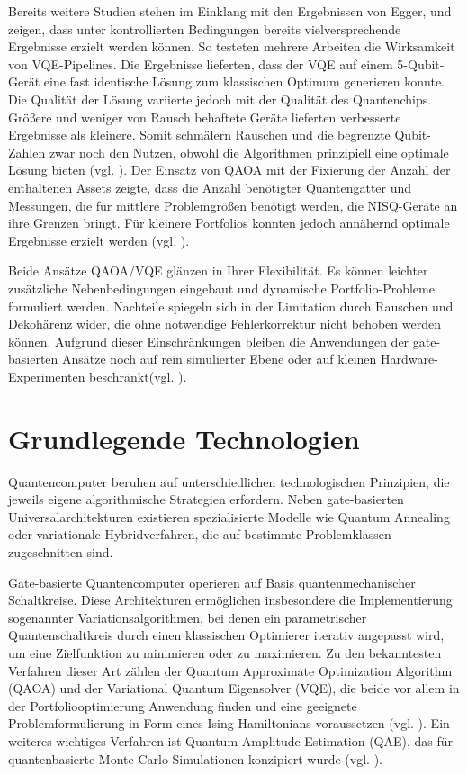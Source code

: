 Bereits weitere Studien stehen im Einklang mit den Ergebnissen von Egger, und zeigen, dass unter kontrollierten Bedingungen bereits vielversprechende Ergebnisse erzielt werden können. So testeten mehrere Arbeiten die Wirksamkeit von VQE-Pipelines. Die Ergebnisse lieferten, dass der VQE auf einem 5-Qubit-Gerät eine fast identische Lösung zum klassischen Optimum generieren konnte. Die Qualität der Lösung variierte jedoch mit der Qualität des Quantenchips. Größere und weniger von Rausch behaftete Geräte lieferten verbesserte Ergebnisse als kleinere. Somit schmälern Rauschen und die begrenzte Qubit-Zahlen zwar noch den Nutzen, obwohl die Algorithmen prinzipiell eine optimale Lösung bieten (vgl. \cite{buonaiuto_best_2023}).
Der Einsatz von QAOA mit der Fixierung der Anzahl der enthaltenen Assets zeigte, dass die Anzahl benötigter Quantengatter und Messungen, die für mittlere Problemgrößen benötigt werden, die NISQ-Geräte an ihre Grenzen bringt. Für kleinere Portfolios konnten jedoch annähernd optimale Ergebnisse erzielt werden (vgl. \cite{brandhofer_benchmarking_2022}).
 
Beide Ansätze QAOA/VQE glänzen in Ihrer Flexibilität. Es können leichter zusätzliche Nebenbedingungen eingebaut und dynamische Portfolio-Probleme formuliert werden. Nachteile spiegeln sich in der Limitation durch Rauschen und Dekohärenz wider, die ohne notwendige Fehlerkorrektur nicht behoben werden können. Aufgrund dieser Einschränkungen bleiben die Anwendungen der gate-basierten Ansätze noch auf rein simulierter Ebene oder auf kleinen Hardware-Experimenten beschränkt(vgl. \cite{buonaiuto_best_2023}).


\section{Grundlegende Technologien}

Quantencomputer beruhen auf unterschiedlichen technologischen Prinzipien, die jeweils eigene algorithmische Strategien erfordern. Neben gate-basierten Universalarchitekturen existieren spezialisierte Modelle wie Quantum Annealing oder variationale Hybridverfahren, die auf bestimmte Problemklassen zugeschnitten sind.

Gate-basierte Quantencomputer operieren auf Basis quantenmechanischer Schaltkreise. Diese Architekturen ermöglichen insbesondere die Implementierung sogenannter Variationsalgorithmen, bei denen ein parametrischer Quantenschaltkreis durch einen klassischen Optimierer iterativ angepasst wird, um eine Zielfunktion zu minimieren oder zu maximieren. Zu den bekanntesten Verfahren dieser Art zählen der Quantum Approximate Optimization Algorithm (QAOA) und der Variational Quantum Eigensolver (VQE), die beide vor allem in der Portfoliooptimierung Anwendung finden und eine geeignete Problemformulierung in Form eines Ising-Hamiltonians voraussetzen (vgl. \cite{brandhofer_benchmarking_2022, buonaiuto_best_2023}). Ein weiteres wichtiges Verfahren ist Quantum Amplitude Estimation (QAE), das für quantenbasierte Monte-Carlo-Simulationen konzipiert wurde (vgl. \cite{egger_quantum_2020}).

